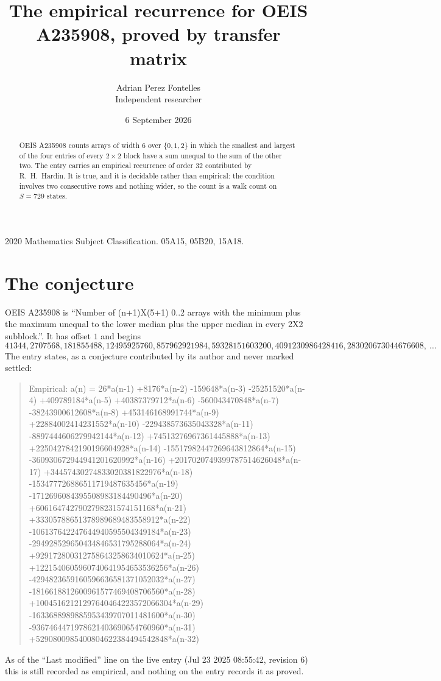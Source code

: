 \documentclass[11pt,a4paper]{article}
\title{The empirical recurrence for OEIS A235908, proved by transfer matrix}
\author{Adrian Perez Fontelles\\ \small Independent researcher}
\date{6 September 2026}
\theoremstyle{plain}
\theoremstyle{definition}
\begin{document}
\maketitle

\begin{abstract}
OEIS A235908 counts arrays of width $6$ over $\{0,1,2\}$ in which the smallest and largest of the
four entries of every $2\times2$ block have a sum unequal to the sum of the other two. The entry
carries an empirical recurrence of order $32$ contributed by R.~H.~Hardin. It is true, and
it is decidable rather than empirical: the condition involves two consecutive rows and nothing
wider, so the count is a walk count on $S=729$ states.
\end{abstract}

\noindent\small 2020 Mathematics Subject Classification. 05A15, 05B20, 15A18.\normalsize

\section{The conjecture}

OEIS A235908 is ``Number of (n+1)X(5+1) 0..2 arrays with the minimum plus the maximum unequal to the lower median plus the upper median in every 2X2 subblock.''. It has offset $1$ and begins
\[
41344, 2707568, 181855488, 12495925760, 857962921984, 59328151603200, 4091230986428416, 283020673044676608,\ \dots
\]
The entry states, as a conjecture contributed by its author and never marked settled:
\begin{quote}
Empirical: a(n) = 26*a(n-1) +8176*a(n-2) -159648*a(n-3) -25251520*a(n-4) +409789184*a(n-5) +40387379712*a(n-6) -560043470848*a(n-7) -38243900612608*a(n-8) +453146168991744*a(n-9) +22884002414231552*a(n-10) -229438573635043328*a(n-11) -8897444606279942144*a(n-12) +74513276967361445888*a(n-13) +2250427842190196604928*a(n-14) -15517982447269643812864*a(n-15) -360930672944941201620992*a(n-16) +2017020749399787514626048*a(n-17) +34457430274833020381822976*a(n-18) -153477726886511719487635456*a(n-19) -1712696084395508983184490496*a(n-20) +6061647427902798231574151168*a(n-21) +33305788651378989689483558912*a(n-22) -106137642247644940595504349184*a(n-23) -294928529650434846531795288064*a(n-24) +929172800312758643258634010624*a(n-25) +1221540605960740641954653536256*a(n-26) -4294823659160596636581371052032*a(n-27) -1816618812600961577469408706560*a(n-28) +10045162121297640464223572066304*a(n-29) -1633688989885953439707011481600*a(n-30) -9367464471978621403690654760960*a(n-31) +5290800985400804622384494542848*a(n-32)
\end{quote}
As of the ``Last modified'' line on the live entry (Jul 23 2025 08:55:42, revision 6) this is still
recorded as empirical, and nothing on the entry records it as proved.
\end{document}
